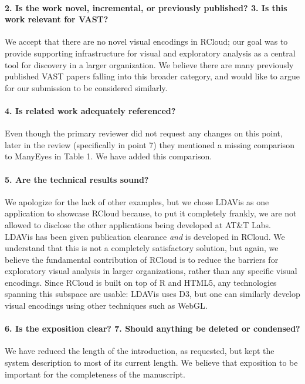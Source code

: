 \documentclass{article}
\begin{document}
\paragraph*{2. Is the work novel, incremental, or previously published? 3. Is this work relevant for VAST?}
We accept that there are no novel visual encodings in RCloud; our goal
was to provide supporting infrastructure for visual and exploratory
analysis as a central tool for discovery in a larger organization. We
believe there are many previously published VAST papers falling into
this broader category, and would like to argue for our submission to
be considered similarly.

\paragraph*{4. Is related work adequately referenced?}
Even though the primary reviewer did not request any changes on this
point, later in the review (specifically in point 7) they mentioned a
missing comparison to ManyEyes in Table 1. We have added this
comparison.

\paragraph*{5. Are the technical results sound?}
We apologize for the lack of other examples, but we chose LDAVis as
one application to showcase RCloud because, to put it completely
frankly, we are not allowed to disclose the other applications being
developed at AT\&T Labs. LDAVis has been given publication clearance
\emph{and} is developed in RCloud. We understand that this is not a
completely satisfactory solution, but again, we believe the
fundamental contribution of RCloud is to reduce the barriers for
exploratory visual analysis in larger organizations, rather than any
specific visual encodings. Since RCloud is built on top of R and
HTML5, any technologies spanning this subspace are usable: LDAVis uses
D3, but one can similarly develop visual encodings using other
techniques such as WebGL.

\paragraph*{6. Is the exposition clear? 7. Should anything be deleted or condensed?}
We have reduced the length of the introduction, as requested, but kept
the system description to most of its current length. We believe that
exposition to be important for the completeness of the manuscript.
\end{document}
